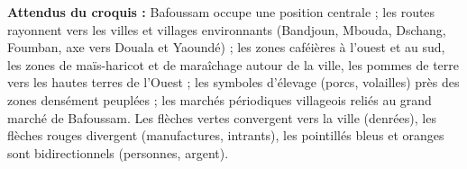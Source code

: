 \documentclass[11pt]{article}
\begin{document}
\begin{corrige}
\textbf{Attendus du croquis :} Bafoussam occupe une position centrale ; les routes rayonnent vers les villes et villages environnants (Bandjoun, Mbouda, Dschang, Foumban, axe vers Douala et Yaoundé) ; les zones caféières à l'ouest et au sud, les zones de maïs-haricot et de maraîchage autour de la ville, les pommes de terre vers les hautes terres de l'Ouest ; les symboles d'élevage (porcs, volailles) près des zones densément peuplées ; les marchés périodiques villageois reliés au grand marché de Bafoussam. Les flèches vertes convergent vers la ville (denrées), les flèches rouges divergent (manufactures, intrants), les pointillés bleus et oranges sont bidirectionnels (personnes, argent).


\end{corrige}
\end{document}
